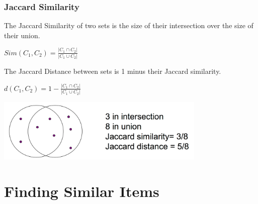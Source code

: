 \documentclass[svgnames]{beamer}
\begin{document}
  
\begin{frame} \frametitle{Jaccard Similarity}
The Jaccard Similarity of two sets is the size of their intersection over the size of their union.

\begin{block}{}
\begin{center}
$Sim(C_1, C_2) = \frac{|C_1 \cap C_2|}{|C_1 \cup C_2|}$
\end{center}
\end{block} 

The Jaccard Distance between sets is 1 minus their Jaccard similarity.

\begin{block}{}
\begin{center}
$d(C_1, C_2) = 1 - \frac{|C_1 \cap C_2|}{|C_1 \cup C_2|}$
\end{center}
\end{block} 

\includegraphics[width=10cm]{jaccard}
\end{frame}

  
\section{Finding Similar Items}

  
\end{document}
